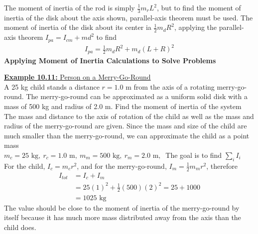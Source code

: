 \documentclass[a4paper]{article}
\let\bf\textbf
\newcommand\m{\text{ m}}
\newcommand\kg{\text{ kg}}
\begin{document}
The moment of inertia of the rod is simply $\frac{1}{3}m_rL^2$, but to find the moment of inertia of the disk about the axis shown, parallel-axis theorem must be used. The moment of inertia of the disk about its center ia $\frac{1}{2}m_dR^2$, applying the parallel-axis theorem $I_{pa} = I_{cm} + md^2$ to find
\begin{align*}
    I_{pa} = \frac{1}{2}m_dR^2 + m_d(L + R)^2
\end{align*}
\bf{Applying Moment of Inertia Calculations to Solve Problems}
\begin{shaded}
    \underline{\bf{Example 10.11:} Person on a Merry-Go-Round}
    \vspace{2mm}\\
    A 25 kg child stands a distance $r = 1.0\m$ from the axis of a rotating merry-go-round. The merry-go-round can be approximated as a uniform solid disk with a mass of 500 kg and radius of 2.0 m. Find the moment of inertia of the system
    \vspace{1mm}\\
    The mass and distance to the axis of rotation of the child as well as the mass and radius of the merry-go-round are given. Since the mass and size of the child are much smaller than the merry-go-round, we can approximate the child as a point mass\\
    $m_c = 25\kg,\ r_c = 1.0\m,\ m_m = 500\kg,\ r_m = 2.0\m,\ $ The goal is to find $\sum\limits_{i}I_i$
    \vspace{1mm}\\
    For the child, $I_c = m_cr^2$, and for the merry-go-round, $I_m = \frac{1}{2}m_mr^2$, therefore
    \begin{align*}
        I_{tot} &= I_c + I_m\\
        &= 25(1)^2 + \frac{1}{2}(500)(2)^2 = 25 + 1000\\
        &= 1025\kg
    \end{align*}
    The value should be close to the moment of inertia of the merry-go-round by itself because it has much more mass distributed away from the axis than the child does.
\end{shaded}
\end{document}
